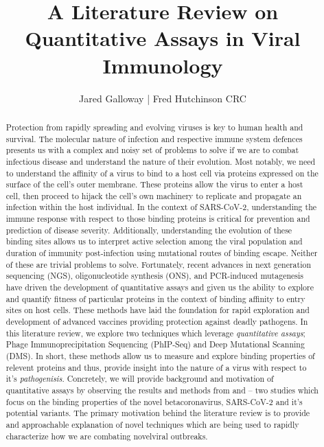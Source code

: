 \documentclass{article}
\title{A Literature Review on Quantitative Assays in Viral Immunology}
\author{Jared Galloway | Fred Hutchinson CRC}
\begin{document}
\maketitle

\begin{abstract}
Protection from rapidly spreading and evolving viruses is key to human health and survival.
The molecular nature of infection and respective immune system defences presents us with a complex and noisy set of problems to solve if we are to combat infectious disease and understand the nature of their evolution.
Most notably, we need to understand the affinity of a virus to bind to a host cell via proteins expressed on the surface of the cell's outer membrane.
These proteins allow the virus to enter a host cell, then proceed to hijack the cell's own machinery to replicate and propagate an infection within the host individual.
In the context of SARS-CoV-2, understanding the immune response with respect to those binding proteins is critical for prevention and prediction of disease severity.
Additionally, understanding the evolution of these binding sites allows us to interpret active selection among the viral population
and duration of immunity post-infection using mutational routes of binding escape.
Neither of these are trivial problems to solve.
Fortunately, recent advances in next generation sequencing (NGS), oligonucleotide synthesis (ONS), and PCR-induced mutagenesis have driven the development of quantitative assays and given us the ability to explore and quantify fitness of particular proteins in the context of binding affinity to entry sites on host cells.
These methods have laid the foundation for rapid exploration and development of advanced vaccines providing protection against deadly pathogens.
In this literature review, we explore two techniques which leverage \textit{quantitative assays}; Phage Immunoprecipitation Sequencing (PhIP-Seq) and Deep Mutational Scanning (DMS).
In short, these methods allow us to measure and explore binding properties of relevent proteins and thus, provide insight into the nature of a virus with respect to it's \textit{pathogenisis}.
Concretely, we will provide background and motivation of quantitative assays by observing the results and methods from \citet{Shrock2020} and \citet{Starr2020} -- 
two studies which focus on the binding properties of the novel betacoronavirus, SARS-CoV-2 and it's potential variants.
The primary motivation behind the literature review is to provide and approachable explanation of novel techniques which are being used to rapidly characterize how we are combating novelviral outbreaks.
\end{abstract}
\end{document}
